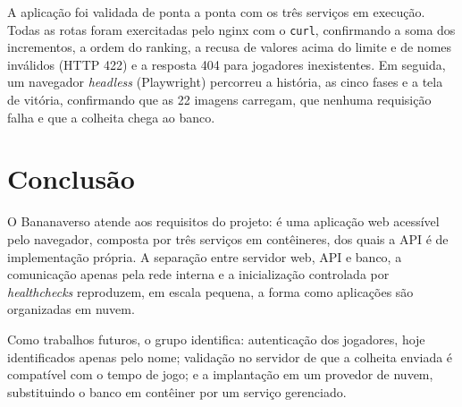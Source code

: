 \documentclass[12pt]{article}
\begin{document}
A aplicação foi validada de ponta a ponta com os três serviços em
execução. Todas as rotas foram exercitadas pelo nginx com o
\texttt{curl}, confirmando a soma dos incrementos, a ordem do ranking, a
recusa de valores acima do limite e de nomes inválidos (HTTP 422) e a
resposta 404 para jogadores inexistentes. Em seguida, um navegador
\emph{headless} (Playwright) percorreu a história, as cinco fases e a tela
de vitória, confirmando que as 22 imagens carregam, que nenhuma
requisição falha e que a colheita chega ao banco.

\section{Conclusão}\label{sec:conclusao}

O Bananaverso atende aos requisitos do projeto: é uma aplicação web
acessível pelo navegador, composta por três serviços em contêineres, dos
quais a API é de implementação própria. A separação entre servidor web,
API e banco, a comunicação apenas pela rede interna e a inicialização
controlada por \emph{healthchecks} reproduzem, em escala pequena, a forma
como aplicações são organizadas em nuvem.

Como trabalhos futuros, o grupo identifica: autenticação dos jogadores,
hoje identificados apenas pelo nome; validação no servidor de que a
colheita enviada é compatível com o tempo de jogo; e a implantação em um
provedor de nuvem, substituindo o banco em contêiner por um serviço
gerenciado.
\end{document}

